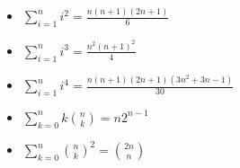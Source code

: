 \begin{itemize}
\item $\sum\limits_{i = 1}^{n} i^2 = \frac{n(n + 1)(2n + 1)}{6}$
\item $\sum\limits_{i = 1}^{n} i^3 = \frac{n^2(n + 1)^2}{4}$
\item $\sum\limits_{i = 1}^{n} i^4 = \frac{n(n + 1)(2n + 1)(3n^2 + 3n - 1)}{30}$
\item $\sum\limits_{k = 0}^{n} k \binom{n}{k} = n 2^{n - 1}$
\item $\sum\limits_{k = 0}^{n} \binom{n}{k}^2 = \binom{2n}{n}$
\end{itemize}